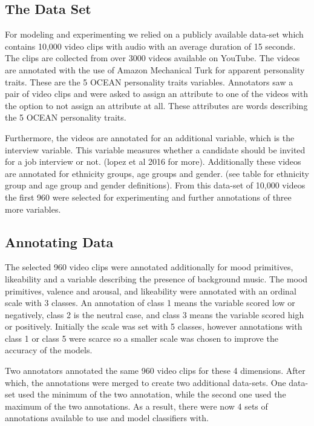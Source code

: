 \subsection{The Data Set}
\label{subsection:dataset}
For modeling and experimenting we relied on a publicly available data-set which contains 10,000 video clips with audio with an average duration of 15 seconds. The clips are collected from over 3000 videos available on YouTube. The videos are annotated with the use of Amazon Mechanical Turk for apparent personality traits. These are the 5 OCEAN personality traits variables. Annotators saw a pair of video clips and were asked to assign an attribute to one of the videos with the option to not assign an attribute at all. These attributes are words describing the 5 OCEAN personality traits. 

Furthermore, the videos are annotated for an additional variable, which is the interview variable. This variable measures whether a candidate should be invited for a job interview or not. (lopez et al 2016 for more). Additionally these videos are annotated for ethnicity groups, age groups and gender. (see table for ethnicity group and age group and gender definitions). From this data-set of 10,000 videos the first 960 were selected for experimenting and further annotations of three more variables. 

\subsection{Annotating Data}
\label{subsection:annotatingdata}
The selected 960 video clips were annotated additionally for mood primitives, likeability and a variable describing the presence of background music. The mood primitives, valence and arousal, and likeability were annotated with an ordinal scale with 3 classes. An annotation of class 1 means the variable scored low or negatively, class 2 is the neutral case, and class 3 means the variable scored high or positively. Initially the scale was set with 5 classes, however annotations with class 1 or class 5 were scarce so a smaller scale was chosen to improve the accuracy of the models. 

Two annotators annotated the same 960 video clips for these 4 dimensions. After which, the annotations were merged to create two additional data-sets. One data-set used the minimum of the two annotation, while the second one used the maximum of the two annotations. As a result, there were now 4 sets of annotations available to use and model classifiers with.

